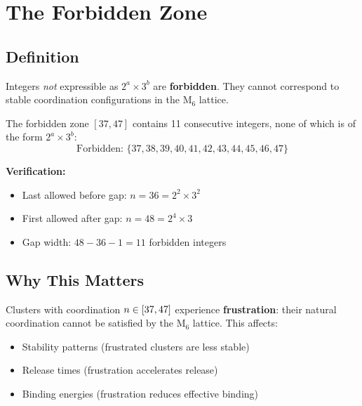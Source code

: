 \section{The Forbidden Zone}
\label{sec:M6:forbidden}

\subsection{Definition}

Integers \emph{not} expressible as $2^a \times 3^b$ are \textbf{forbidden}. They
cannot correspond to stable coordination configurations in the M$_6$ lattice.

\begin{derivationbox}[title=Forbidden Zone]
    The forbidden zone $[37, 47]$ contains 11 consecutive integers, none of
    which is of the form $2^a \times 3^b$: \tagDer
    \begin{equation}
        \text{Forbidden: } \{37, 38, 39, 40, 41, 42, 43, 44, 45, 46, 47\}
        \label{eq:forbidden_zone}
    \end{equation}

    \textbf{Verification:}
    \begin{itemize}
        \item Last allowed before gap: $n = 36 = 2^2 \times 3^2$
        \item First allowed after gap: $n = 48 = 2^4 \times 3$
        \item Gap width: $48 - 36 - 1 = 11$ forbidden integers
    \end{itemize}
\end{derivationbox}

\subsection{Why This Matters}

Clusters with coordination $n \in [37, 47]$ experience \textbf{frustration}:
their natural coordination cannot be satisfied by the M$_6$ lattice. This affects:
\begin{itemize}
    \item Stability patterns (frustrated clusters are less stable)
    \item Release times (frustration accelerates release)
    \item Binding energies (frustration reduces effective binding)
\end{itemize}

